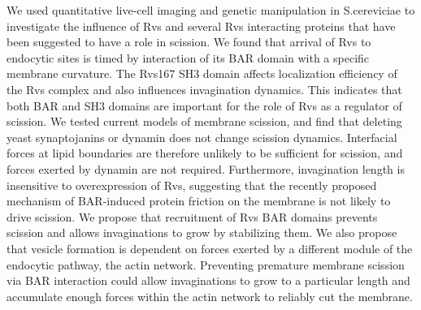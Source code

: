 \documentclass[9pt,lineno]{elife}
\begin{document}
We used quantitative live-cell imaging and genetic manipulation in S.cereviciae to investigate the influence of Rvs and several Rvs interacting proteins that have been suggested to have a role in scission. We found that arrival of Rvs to endocytic sites is timed by interaction of its BAR domain with a specific membrane curvature. The Rvs167 SH3 domain affects localization efficiency of the Rvs complex and also influences invagination dynamics. This indicates that both BAR and SH3 domains are important for the role of Rvs as a regulator of scission. We tested current models of membrane scission, and find that deleting yeast synaptojanins or dynamin does not change scission dynamics. Interfacial forces at lipid boundaries are therefore unlikely to be sufficient for scission, and forces exerted by dynamin are not required. Furthermore, invagination length is insensitive to overexpression of Rvs, suggesting that the recently proposed mechanism of BAR-induced protein friction on the membrane is not likely to drive scission. We propose that recruitment of Rvs BAR domains prevents scission and allows invaginations to grow by stabilizing them. We also propose that vesicle formation is dependent on forces exerted by a different module of the endocytic pathway, the actin network. Preventing premature membrane scission via BAR interaction could allow invaginations to grow to a particular length and accumulate enough forces within the actin network to reliably cut the membrane. 


\end{document}
